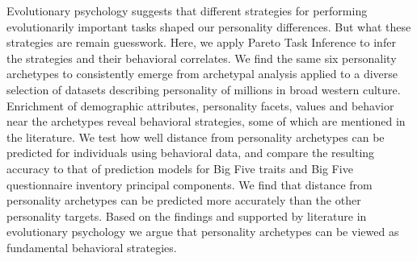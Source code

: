 Evolutionary psychology suggests that different strategies for performing evolutionarily important tasks shaped our personality differences. But what these strategies are remain guesswork. Here, we apply Pareto Task Inference to infer the strategies and their behavioral correlates. We find the same six personality archetypes to consistently emerge from archetypal analysis applied to a diverse selection of datasets describing personality of millions in broad western culture. Enrichment of demographic attributes, personality facets, values and behavior near the archetypes reveal behavioral strategies, some of which are mentioned in the literature. We test how well distance from personality archetypes can be predicted for individuals using behavioral data, and compare the resulting accuracy to that of prediction models for Big Five traits and Big Five questionnaire inventory principal components. We find that distance from personality archetypes can be predicted more accurately than the other personality targets. Based on the findings and supported by literature in evolutionary psychology we argue that personality archetypes can be viewed as fundamental behavioral strategies.
